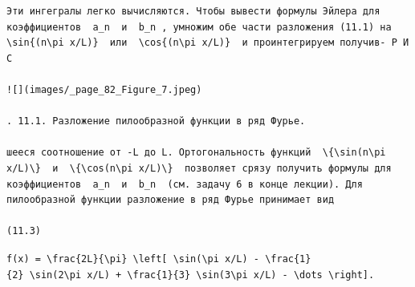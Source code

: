 \documentclass[
  ukrainian,
]{article}
\begin{document}
\begin{verbatim}
Эти ингегралы легко вычисляются. Чтобы вывести формулы Эйлера для коэффициентов  a_n  и  b_n , умножим обе части разложения (11.1) на  \sin{(n\pi x/L)}  или  \cos{(n\pi x/L)}  и проинтегрируем получив- Р И С

![](images/_page_82_Figure_7.jpeg)

. 11.1. Разложение пилообразной функции в ряд Фурье.

шееся соотношение от -L до L. Ортогональность функций  \{\sin(n\pi x/L)\}  и  \{\cos(n\pi x/L)\}  позволяет срязу получить формулы для коэффициентов  a_n  и  b_n  (см. задачу 6 в конце лекции). Для пилообразной функции разложение в ряд Фурье принимает вид

(11.3)
\end{verbatim}

\texttt{f(x)\ =\ \textbackslash{}frac\{2L\}\{\textbackslash{}pi\}\ \textbackslash{}left{[}\ \textbackslash{}sin(\textbackslash{}pi\ x/L)\ -\ \textbackslash{}frac\{1\}\{2\}\ \textbackslash{}sin(2\textbackslash{}pi\ x/L)\ +\ \textbackslash{}frac\{1\}\{3\}\ \textbackslash{}sin(3\textbackslash{}pi\ x/L)\ -\ \textbackslash{}dots\ \textbackslash{}right{]}.}
\end{document}
